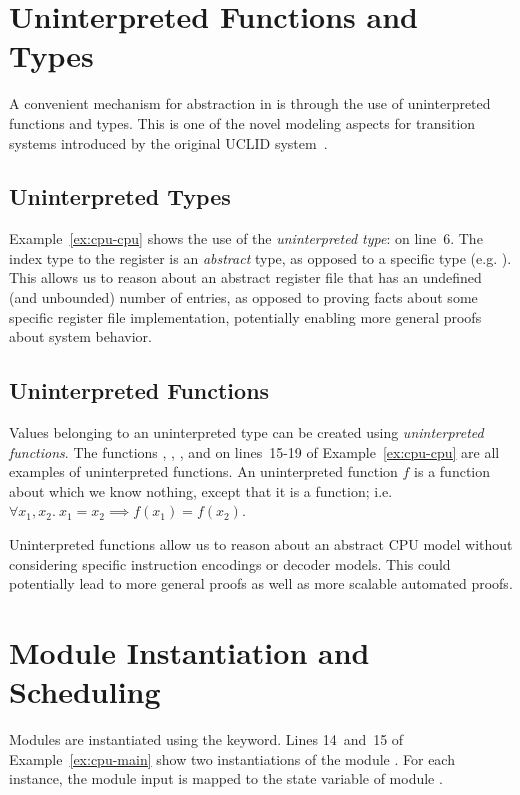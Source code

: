 \section{Uninterpreted Functions and Types}
A convenient mechanism for abstraction in \uclid{} is through the use of uninterpreted functions and types. This is one of the novel modeling
aspects for transition systems introduced by the original UCLID system~\cite{bryant-cav02}.

\subsection{Uninterpreted Types}
Example~\ref{ex:cpu-cpu} shows the use of the \emph{uninterpreted type}:  on line~6. The index type to the register is an \emph{abstract} type, as opposed to a specific type (e.g. ). This allows us to reason about an abstract register file that has an undefined (and unbounded) number of entries, as opposed to proving facts about some specific register file implementation, potentially enabling more general proofs about system behavior.

\subsection{Uninterpreted Functions}
Values belonging to an uninterpreted type can be created using \emph{uninterpreted functions}. The functions , , ,  and  on lines~15-19 of Example~\ref{ex:cpu-cpu} are all examples of uninterpreted functions. An uninterpreted function $f$ is a function about which we know nothing, except that it is a function; i.e. $\forall x_1, x_2.~ x_1 = x_2 \implies f(x_1) = f(x_2)$.

Uninterpreted functions allow us to reason about an abstract CPU model without considering specific instruction encodings or decoder models. This could potentially lead to more general proofs as well as more scalable automated proofs. 


\section{Module Instantiation and Scheduling}

Modules are instantiated using the  keyword. Lines 14~and~15 of Example~\ref{ex:cpu-main} show two instantiations of the module . For each instance, the module input  is mapped to the state variable  of module .

